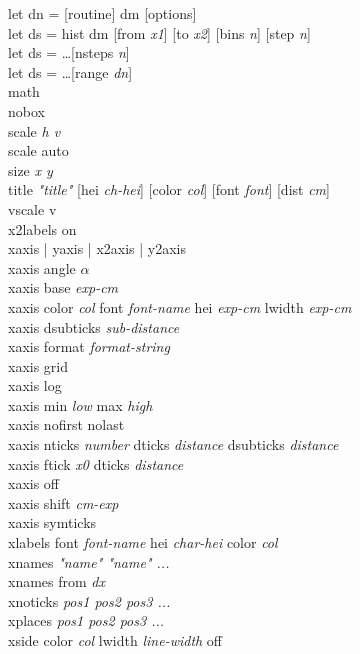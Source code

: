 {\sf let dn = [routine] dm [options]} \\
{\sf let ds = hist dm [from {\it x1}] [to {\it x2}] [bins {\it n}] [step {\it n}]} \\
{\sf let ds = \ldots [nsteps {\it n}]} \\
{\sf let ds = \ldots [range {\it dn}]} \\
{\sf math } \\
{\sf nobox } \\
{\sf scale {\it h v}} \\
{\sf scale auto} \\
{\sf size {\it x y }}\\
{\sf title {\it "title"}  [hei {\it ch-hei}] [color {\it col}] [font {\it font}] [dist {\it cm}]  }   \\
{\sf vscale v} \\
{\sf x2labels on} \\
{\sf xaxis | yaxis | x2axis | y2axis}\\
{\sf xaxis angle $\alpha$} \\
{\sf xaxis base {\it exp-cm}}  \\
{\sf xaxis color {\it col} font {\it font-name}  hei {\it exp-cm} lwidth {\it exp-cm}} \\
{\sf xaxis dsubticks {\it sub-distance} }  \\
{\sf xaxis format {\it format-string} } \\
{\sf xaxis grid }  \\
{\sf xaxis log}  \\
{\sf xaxis min {\it low} max {\it high}}  \\
{\sf xaxis nofirst nolast}  \\
{\sf xaxis nticks {\it number} dticks {\it distance} dsubticks {\it distance}} \\
{\sf xaxis ftick {\it x0} dticks {\it distance}} \\
{\sf xaxis {\sf off}}  \\
{\sf xaxis shift {\it cm-exp}}  \\
{\sf xaxis symticks} \\
{\sf xlabels font {\it font-name} hei {\it char-hei} color {\it col} }\\
{\sf xnames {\it "name"  "name" ...}}  \\
{\sf xnames from {\it dx}}  \\
{\sf xnoticks {\it pos1 pos2 pos3 ...}}  \\
{\sf xplaces {\it pos1 pos2 pos3 ...}}  \\
{\sf xside color {\it col} lwidth {\it line-width} off  } \\
